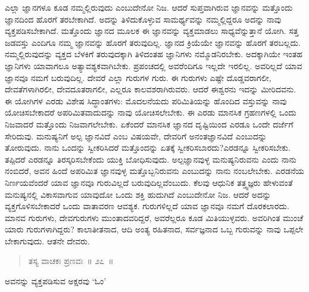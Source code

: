 ಎಲ್ಲಾ ಜ್ಞಾನಗಳೂ ಕೂಡ ನಮ್ಮಲ್ಲಿರುವುದು ಎಂಬುದೇನೋ ನಿಜ. ಆದರೆ ಸುಪ್ತವಾಗಿರುವ ಜ್ಞಾನವನ್ನು ಮತ್ತೊಂದು ಜ್ಞಾನದಿಂದ ಹೊರಗೆ ತರಬೇಕಾಗಿದೆ. ಅದನ್ನು ತಿಳಿದುಕೊಳ್ಳುವ ಸಾಮರ್ಥ್ಯವನ್ನು ನಮ್ಮಲ್ಲಿದ್ದರೂ ಅದನ್ನು ನಾವು ವ್ಯಕ್ತಪಡಿಸಬೇಕಾಗಿದೆ. ಮತ್ತೊಂದು ಜ್ಞಾನದ ಮೂಲಕ ಈ ಜ್ಞಾನವನ್ನು ವ್ಯಕ್ತಮಾಡಲು ಸಾಧ್ಯವೆನ್ನುತ್ತಾನೆ ಯೋಗಿ. ಸತ್ತ ಜಡವಸ್ತು ಎಂದಿಗೂ ನಮ್ಮ ಜ್ಞಾನವನ್ನು ಹೊರಗೆ ತರುವುದಿಲ್ಲ. ಜ್ಞಾನದ ಕ್ರಿಯೆಯೇ ಜ್ಞಾನವನ್ನು ಹೊರಗೆ ತರಬಲ್ಲದು. ನಮ್ಮಲ್ಲಿರುವುದನ್ನು ವ್ಯಕ್ತದ ಬೆಳಕಿಗೆ ತರುವುದಕ್ಕಾಗಿ ತಿಳಿದಂತಹ ಜ್ಞಾನಿಗಳು ನಮ್ಮೊಡನಿರಬೇಕು. ಅದಕ್ಕಾಗಿಯೇ ಇಂತಹ ಜ್ಞಾನಿಗಳು ಯಾವಾಗಲೂ ಅತ್ಯಾವಶ್ಯಕವಾಗಿಬೇಕು. ಪ್ರಪಂಚದಲ್ಲಿ ಅವರೆಂದಿಗೂ ಇಲ್ಲದೇ ಇರಲಿಲ್ಲ. ಅವರಿಲ್ಲದೆ ಯಾವ ಜ್ಞಾನವೂ ನಮಗೆ ಬರುವುದಿಲ್ಲ. ದೇವರೆ ಎಲ್ಲಾ ಗುರುಗಳ ಗುರು. ಈ ಗುರುಗಳು ಎಷ್ಟೇ ದೊಡ್ಡವರಾಗಲೀ, ದೇವತೆಗಳಾಗಿರಲೀ, ದೇವದೂತರಾಗಲೀ, ಎಲ್ಲರೂ ಕಾಲವಶರಾಗಿರುವರು. ಆದರೆ ಈಶ್ವರನು ಇದನ್ನು ಮೀರಿದವನು. ಈ ಯೋಗಿಗಳ ಎರಡು ವಿಶೇಷ ಸಿದ್ಧಾಂತಗಳು: ಮೊದಲನೆಯದು ಪರಿಮಿತಿಯನ್ನು ಹೊಂದಿದ ವಸ್ತುವನ್ನು ನಾವು ಯೋಚಿಸಬೇಕಾದರೆ ಅಪರಿಮಿತವಾದುದನ್ನು ನಾವು ಯೋಚಿಸಲೇಬೇಕು. ಈ ಎರಡು ಮಾನಸಿಕ ಗ್ರಹಣಗಳಲ್ಲಿ ಒಂದು ನಿಜವಾದರೆ ಮತ್ತೊಂದು ನಿಜವಾಗಲೇಬೇಕು. ಏಕೆಂದರೆ ಮಾನಸಿಕ ಜ್ಞಾನದ ದೃಷ್ಟಿಯಿಂದ ಎರಡೂ ಒಂದೇ ದರ್ಜೆಗೆ ಸೇರಿದುವು. ಮನುಷ್ಯನಿಗೆ ಅಲ್ಪ ಜ್ಞಾನವಿದೆ ಎಂಬ ವಿಷಯವೇ, ದೇವರಿಗೆ ಅನಂತಜ್ಞಾನವಿದೆ ಎಂಬುದನ್ನು ತೋರುವುದು. ನಾನು ಒಂದನ್ನು ಸ್ವೀಕರಿಸಿದರೆ ಮತ್ತೊಂದನ್ನು ಏತಕ್ಕೆ ಸ್ವೀಕರಿಸಬಾರದು?\break ಎರಡನ್ನೂ ಸ್ವೀಕರಿಸಬೇಕು. ತಪ್ಪಿದರೆ ಎರಡನ್ನೂ ತಿರಸ್ಕರಿಸಬೇಕೆಂದು ಯುಕ್ತಿ ಬೋಧಿಸುವುದು. ಅಲ್ಪಜ್ಞಾನವುಳ್ಳ ಮನುಷ್ಯನಿರುವನು ಎಂದು ನಾನು ನಂಬಿದರೆ, ಅವನ ಹಿಂದೆ ಅಪರಿಮಿತ ಜ್ಞಾನವುಳ್ಳ ಮತ್ತೊಬ್ಬನಿರುವನು ಎಂಬುದನ್ನು ನಾನು ನಂಬಲೇಬೇಕು. ಎರಡನೆಯ ನಿರ್ಣಯವೆಂದರೆ ಯಾವ ಜ್ಞಾನವೂ ಗುರುವಿಲ್ಲದೆ ಬರುವುದಿಲ್ಲವೆಂಬುದು. ಕೆಲವು ಆಧುನಿಕ ತತ್ತ್ವಜ್ಞರು ಹೇಳುವಂತೆ ಮನುಷ್ಯನಲ್ಲಿ ವಿಕಾಸವಾಗುವ ಯಾವುದೋ ಒಂದು ಶಕ್ತಿ ಹುದುಗಿದೆ ಎಂಬುದೇನೋ ನಿಜ. ಆದರೆ ಅದನ್ನು ವ್ಯಕ್ತಗೊಳಿಸಬೇಕಾದರೆ ಒಂದು ವಾತಾವರಣ ಆವಶ್ಯಕ. ಗುರುಗಳಿಲ್ಲದೆ ಯಾವ ಜ್ಞಾನವೂ ನಮಗೆ ದೊರಕಲಾರದು. ಮಾನವ ಗುರುಗಳು, ದೇವಗುರುಗಳು ಮುಂತಾದವರಿದ್ದರೆ, ಅವರೆಲ್ಲರೂ ಕೂಡ ಮಿತಿಯುಳ್ಳವರು. ಅವರಿಗಿಂತ ಮುಂಚೆ ಯಾರು ಗುರುಗಳಾಗಿದ್ದರು? ಕಾಲಾತೀತನಾದ, ಆದಿ ಅಂತ್ಯ ರಹಿತನಾದ, ಸರ್ವಜ್ಞನಾದ ಒಬ್ಬ ಗುರುವನ್ನು ನಾವು ಒಪ್ಪಲೇ ಬೇಕಾಗುವುದು. ಆತನೇ ದೇವರು. 

\vspace{-0.3cm}

\begin{verse}
ತಸ್ಯ ವಾಚಕಃ ಪ್ರಣವಃ~॥ ೨೭~॥
\end{verse}

\vspace{-0.3cm}

ಅವನನ್ನು ವ್ಯಕ್ತಪಡಿಸುವ ಅಕ್ಷರವು ‘ಓಂ’


